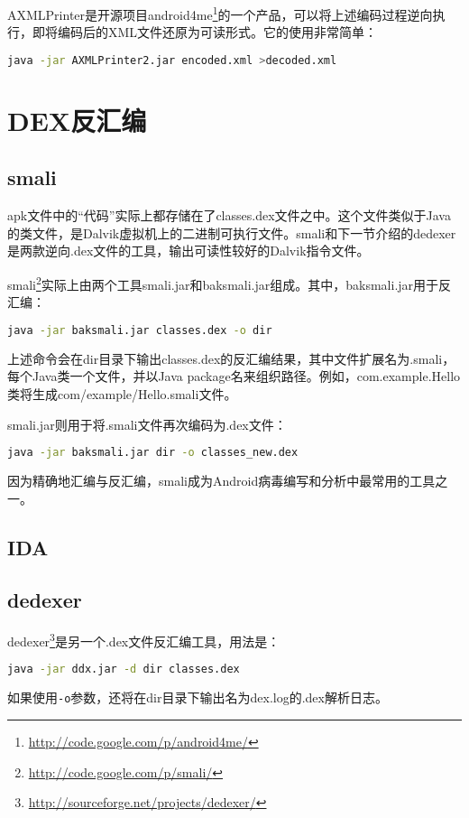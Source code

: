AXMLPrinter是开源项目android4me\footnote{\href{http://code.google.com/p/android4me/}{http://code.google.com/p/android4me/}}的一个产品，可以将上述编码过程逆向执行，即将编码后的XML文件还原为可读形式。它的使用非常简单：
\begin{lstlisting}[language=bash, numbers=none]
java -jar AXMLPrinter2.jar encoded.xml >decoded.xml
\end{lstlisting}
\section{DEX反汇编}
\subsection{smali}
apk文件中的“代码”实际上都存储在了classes.dex文件之中。这个文件类似于Java的类文件，是Dalvik虚拟机上的二进制可执行文件。smali和下一节介绍的dedexer是两款逆向.dex文件的工具，输出可读性较好的Dalvik指令文件。

smali\footnote{\url{http://code.google.com/p/smali/}}实际上由两个工具smali.jar和baksmali.jar组成。其中，baksmali.jar用于反汇编：
\begin{lstlisting}[language=bash, numbers=none]
java -jar baksmali.jar classes.dex -o dir
\end{lstlisting}
上述命令会在dir目录下输出classes.dex的反汇编结果，其中文件扩展名为.smali，每个Java类一个文件，并以Java package名来组织路径。例如，com.example.Hello类将生成com/example/Hello.smali文件。

smali.jar则用于将.smali文件再次编码为.dex文件：
\begin{lstlisting}[language=bash, numbers=none]
java -jar baksmali.jar dir -o classes_new.dex
\end{lstlisting}

因为精确地汇编与反汇编，smali成为Android病毒编写和分析中最常用的工具之一。
\subsection{IDA}
\subsection{dedexer}
dedexer\footnote{\url{http://sourceforge.net/projects/dedexer/}}是另一个.dex文件反汇编工具，用法是：
\begin{lstlisting}[language=bash, numbers=none]
java -jar ddx.jar -d dir classes.dex
\end{lstlisting}
如果使用\lstinline!-o!参数，还将在dir目录下输出名为dex.log的.dex解析日志。
